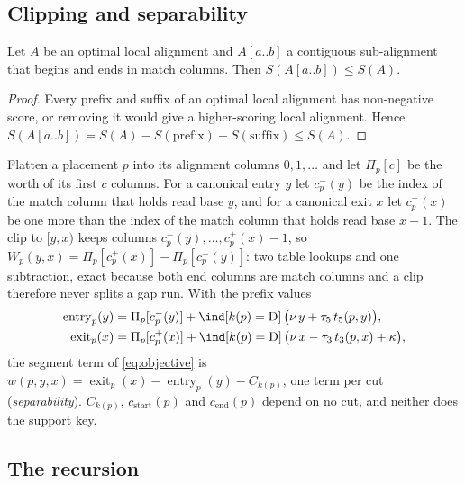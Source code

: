 \documentclass[11pt,a4paper]{article}
\begin{document}
\subsection{Clipping and separability}

\begin{lemma}
\label{lem:clip}
Let $A$ be an optimal local alignment and $A[a..b]$ a contiguous
sub-alignment that begins and ends in match columns. Then
$S(A[a..b])\le S(A)$.
\end{lemma}
\begin{proof}
Every prefix and suffix of an optimal local alignment has non-negative
score, or removing it would give a higher-scoring local alignment. Hence
$S(A[a..b]) = S(A) - S(\text{prefix}) - S(\text{suffix}) \le S(A)$.
\end{proof}

Flatten a placement $p$ into its alignment columns $0,1,\dots$ and let
$\Pi_p[c]$ be the worth of its first $c$ columns. For a canonical entry $y$
let $c^{-}_p(y)$ be the index of the match column that holds read base $y$,
and for a canonical exit $x$ let $c^{+}_p(x)$ be one more than the index of
the match column that holds read base $x-1$. The clip to $[y,x)$ keeps
columns $c^{-}_p(y),\dots,c^{+}_p(x)-1$, so
$W_p(y,x)=\Pi_p[c^{+}_p(x)]-\Pi_p[c^{-}_p(y)]$: two table lookups and one
subtraction, exact because both end columns are match columns and a clip
therefore never splits a gap run. With the prefix values
\begin{equation}
\begin{aligned}
  \operatorname{entry}_p(y) &= \Pi_p[c^{-}_p(y)] + \ind[k(p)=\mathrm D]\,\bigl(\nu\,y + \tau_5\,t_5(p,y)\bigr),\\
  \operatorname{exit}_p(x) &= \Pi_p[c^{+}_p(x)] + \ind[k(p)=\mathrm D]\,\bigl(\nu\,x - \tau_3\,t_3(p,x) + \kappa\bigr),
\end{aligned}
\label{eq:prefix}
\end{equation}
the segment term of \cref{eq:objective} is
$w(p,y,x)=\operatorname{exit}_p(x)-\operatorname{entry}_p(y)-C_{k(p)}$, one
term per cut (\emph{separability}). $C_{k(p)}$, $c_{\text{start}}(p)$ and
$c_{\text{end}}(p)$ depend on no cut, and neither does the support key.

\subsection{The recursion}
\end{document}
